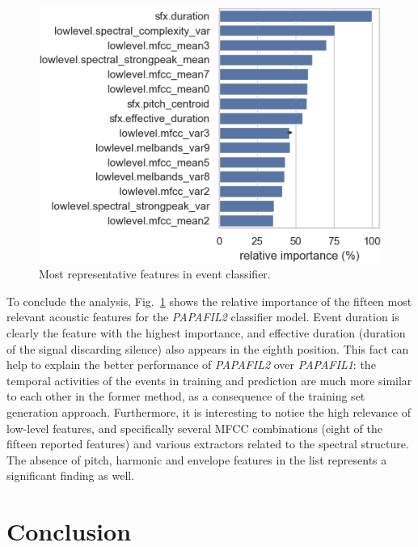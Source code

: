 \begin{figure}[t]
  \centering
  \centerline{\includegraphics[width=\columnwidth]{Figures/SELD/importance_new_tight.png}}
  \caption{Most representative features in event classifier.}
  \label{fig:importance}
\end{figure}

To conclude the analysis, Fig.~\ref{fig:importance} shows the relative importance of the fifteen most relevant acoustic features for the \textit{PAPAFIL2} classifier model.
Event duration is clearly the feature with the highest importance, and effective duration (duration of the signal discarding silence) also appears in the eighth position.
This fact can help to explain the better performance of \textit{PAPAFIL2} over \textit{PAPAFIL1}: the temporal activities of the events in training and prediction are much more similar to each other in the former method, as a consequence of the training set generation approach.
Furthermore, it is interesting to notice the high relevance of low-level features, and specifically several MFCC combinations (eight of the fifteen reported features) and  various extractors related to the spectral structure. The absence of pitch, harmonic and envelope features in the list represents a significant finding as well. 







\section{Conclusion}
\label{sec:results}

